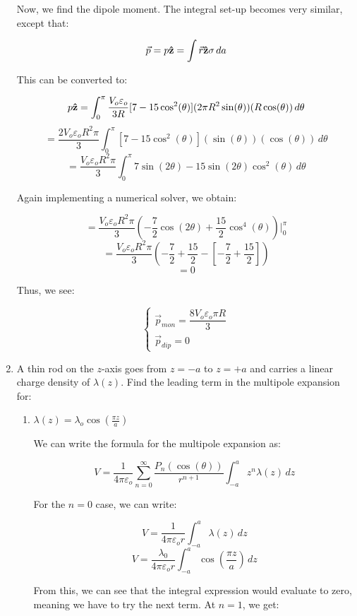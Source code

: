 \begin{enumerate}
      Now, we find the dipole moment. The integral set-up becomes very similar, except that:

      $$\vec{p}=p\bold{\hat{z}}=\int\vec{r}\bold{\hat{z}}\sigma\,da$$

      This can be converted to:

      $$p\bold{\hat{z}}=\int_0^\pi\frac{V_o\varepsilon_o}{3R}[7-15\cos^2(\theta)](2\pi R^2\sin(\theta))(R\cos(\theta))\,d\theta$$
      $$=\frac{2V_o\varepsilon_o R^2\pi}{3}\int_0^\pi[7-15\cos^2(\theta)](\sin(\theta))(\cos(\theta))\,d\theta$$
      $$=\frac{V_o\varepsilon_o R^2\pi}{3}\int_0^\pi 7\sin(2\theta)-15\sin(2\theta)\cos^2(\theta)\,d\theta$$

      Again implementing a numerical solver, we obtain:

      $$=\frac{V_o\varepsilon_o R^2\pi}{3}\left( -\frac{7}{2}\cos(2\theta)+\frac{15}{2}\cos^4(\theta)\right)\Big|_0^\pi$$
      $$=\frac{V_o\varepsilon_o R^2\pi}{3}\left( -\frac{7}{2}+\frac{15}{2}-\left[ -\frac{7}{2}+\frac{15}{2} \right]\right)$$
      $$=0$$

      Thus, we see:

      $$\boxed{\left\{\begin{array}{l}\vec{p}_{mon}=\dfrac{8V_o\varepsilon_o\pi R}{3}\\\vec{p}_{dip}=0\end{array}}$$

  \item A thin rod on the $z$-axis goes from $z=-a$ to $z=+a$ and carries a linear charge density of $\lambda(z)$. Find the leading term in the multipole expansion for:

    \begin{enumerate}

      \item $\lambda(z)=\lambda_o\cos\left( \frac{\pi z}{a} \right)$

        We can write the formula for the multipole expansion as:

        $$V=\frac{1}{4\pi\varepsilon_o}\sum_{n=0}^\infty \frac{P_n(\cos(\theta))}{r^{n+1}}\int_{-a}^az^n\lambda(z)\,dz$$

        For the $n=0$ case, we can write:

        $$V=\frac{1}{4\pi\varepsilon_o r}\int_{-a}^a \lambda(z)\,dz$$
        $$V=\frac{\lambda_0}{4\pi\varepsilon_o r}\int_{-a}^a \cos\left( \frac{\pi z}{a} \right)\,dz$$

        From this, we can see that the integral expression would evaluate to zero, meaning we have to try the next term. At $n=1$, we get:


\end{enumerate}
\end{enumerate}
